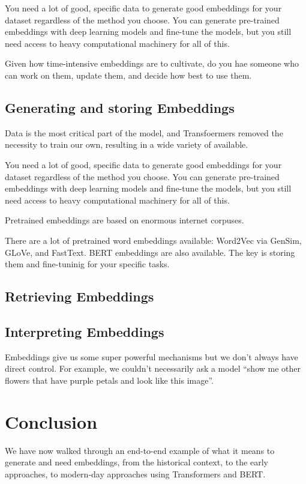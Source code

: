 \documentclass[draft, 11pt]{diazessay} %
\begin{document}
You need a lot of good, specific data to generate good embeddings for your dataset regardless of the method you choose. You can generate pre-trained embeddings with deep learning models and fine-tune the models, but you still need access to heavy computational machinery for all of this. 

Given how time-intensive embeddings are to cultivate, do you hae someone who can work on them, update them, and decide how best to use them. 

\subsection{Generating and storing Embeddings}
Data is the most critical part of the model, and Transfoermers removed the necessity to train our own, resulting in a wide variety of available. 

You need a lot of good, specific data to generate good embeddings for your dataset regardless of the method you choose. You can generate pre-trained embeddings with deep learning models and fine-tune the models, but you still need access to heavy computational machinery for all of this. 

Pretrained embeddings are based on enormous internet corpuses. 

There are a lot of pretrained word embeddings available: Word2Vec via GenSim, GLoVe, and FastText. BERT embeddings are also available. The key is storing them and fine-tuninig for your specific tasks. 

\subsection{Retrieving Embeddings}

\subsection{Interpreting Embeddings}
Embeddings give us some super powerful mechanisms but we don’t always have direct control. For example, we couldn’t necessarily ask a model “show me other flowers that have purple petals and look like this image”.


\section{Conclusion}

We have now walked through an end-to-end example of what it means to generate and need embeddings, from the historical context, to the early approaches, to modern-day approaches using Transformers and BERT. 
\end{document}

